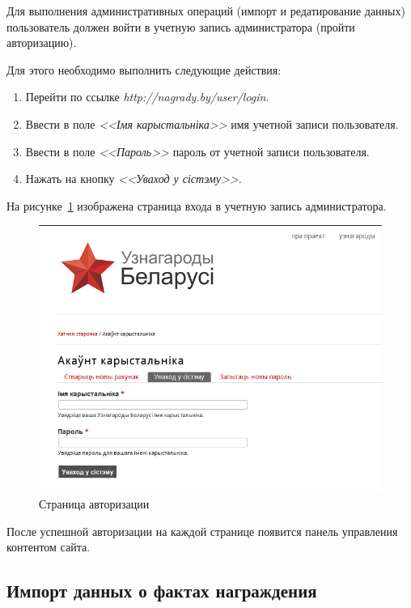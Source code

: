 Для выполнения административных операций 
(импорт и редатирование данных)
пользователь должен войти в учетную запись администратора
(пройти авторизацию).

Для этого необходимо выполнить следующие действия:
\begin{enumerate}
\item Перейти по ссылке \textit{http://nagrady.by/user/login}.
\item Ввести в поле \textit{<<Імя карыстальніка>>} имя учетной записи пользователя.
\item Ввести в поле \textit{<<Пароль>>} пароль от учетной записи пользователя. 
\item Нажать на кнопку \textit{<<Уваход у сістэму>>}.
\end{enumerate}

На рисунке~\ref{fig:login_page} изображена страница входа в учетную запись администратора.

\begin{figure}[h]
  \centering
  \includegraphics[width=150mm]{pic/login_page.png}
  \caption{Страница авторизации}
  \label{fig:login_page}
\end{figure}

После успешной авторизации на каждой странице появится панель управления контентом сайта. 

\subsection{Импорт данных о фактах награждения}
\label{ssec:help_import_awarded}

